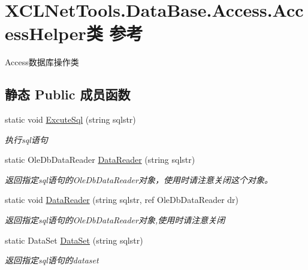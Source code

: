 \hypertarget{class_x_c_l_net_tools_1_1_data_base_1_1_access_1_1_access_helper}{\section{X\-C\-L\-Net\-Tools.\-Data\-Base.\-Access.\-Access\-Helper类 参考}
\label{class_x_c_l_net_tools_1_1_data_base_1_1_access_1_1_access_helper}
}


Access数据库操作类  


\subsection*{静态 Public 成员函数}
\begin{DoxyCompactItemize}
\item 
static void \hyperlink{class_x_c_l_net_tools_1_1_data_base_1_1_access_1_1_access_helper_acb4489fbc85621f6b27e51328e60ba40}{Excute\-Sql} (string sqlstr)
\begin{DoxyCompactList}\small\item\em 执行sql语句 \end{DoxyCompactList}\item 
static Ole\-Db\-Data\-Reader \hyperlink{class_x_c_l_net_tools_1_1_data_base_1_1_access_1_1_access_helper_ac0a538c45b918a7f8d2f3e2f5a7eab30}{Data\-Reader} (string sqlstr)
\begin{DoxyCompactList}\small\item\em 返回指定sql语句的\-Ole\-Db\-Data\-Reader对象，使用时请注意关闭这个对象。 \end{DoxyCompactList}\item 
static void \hyperlink{class_x_c_l_net_tools_1_1_data_base_1_1_access_1_1_access_helper_a1eb9b1ca36a5bd3ea1a3b28d3196f826}{Data\-Reader} (string sqlstr, ref Ole\-Db\-Data\-Reader dr)
\begin{DoxyCompactList}\small\item\em 返回指定sql语句的\-Ole\-Db\-Data\-Reader对象,使用时请注意关闭 \end{DoxyCompactList}\item 
static Data\-Set \hyperlink{class_x_c_l_net_tools_1_1_data_base_1_1_access_1_1_access_helper_a0dbb31f7f093f7bffa5e3ea1e599941e}{Data\-Set} (string sqlstr)
\begin{DoxyCompactList}\small\item\em 返回指定sql语句的dataset \end{DoxyCompactList}\item 

\end{DoxyCompactItemize}
